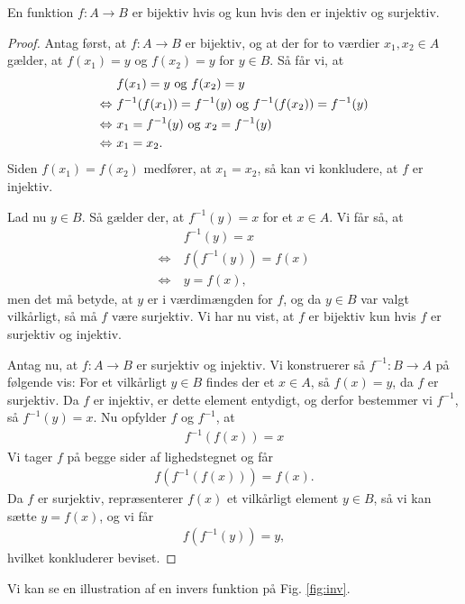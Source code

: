 \begin{setn}
	En funktion $f: A \to B$ er bijektiv hvis og kun hvis den er injektiv og surjektiv. 
\end{setn}
\begin{proof}
	Antag først, at $f: A \to B$ er bijektiv, og at der for to værdier $x_1,x_2\in A$ gælder,
	at $f(x_1) = y$ og $f(x_2)=y$ for $y \in B$. Så får vi, at 
	\begin{align*}
		&f(x_1) = y \textnormal{ og } f(x_2) = y \\
		\Leftrightarrow\  &f^{-1}(f(x_1)) = f^{-1}(y) \textnormal{ og }
		f^{-1}(f(x_2)) = f^{-1}(y)\\
		\Leftrightarrow \ &x_1 = f^{-1}(y) \textnormal{ og } x_2 = f^{-1}(y)\\
		\Leftrightarrow\  &x_1 = x_2.
	\end{align*}
	Siden $f(x_1) = f(x_2)$ medfører, at $x_1 = x_2$, så kan vi konkludere, at $f$ er injektiv.
	
	Lad nu $y\in B$. Så gælder der, at $f^{-1}(y) = x$ for et $x\in A$. Vi får så, at
	\begin{align*}
		&f^{-1}(y) = x  \\
		\Leftrightarrow \ &f(f^{-1}(y)) = f(x) \\
		\Leftrightarrow \ &y = f(x),
	\end{align*}
	men det må betyde, at $y$ er i værdimængden for $f$, og da $y\in B$ var valgt vilkårligt, 
	så må $f$ være surjektiv. Vi har nu vist, at $f$ er bijektiv kun hvis $f$ er surjektiv og 
	injektiv. 
	
	Antag nu, at $f:A\to B$ er surjektiv og injektiv. Vi konstruerer så $f^{-1}:B\to A$ på
	følgende vis: For et vilkårligt $y \in B$ findes der et $x\in A$, så $f(x)= y$, da $f$ er 
	surjektiv. Da $f$ er injektiv, er dette element entydigt, og derfor bestemmer vi $f^{-1}$, 
	så $f^{-1}(y) = x$. Nu opfylder $f$ og $f^{-1}$, at
	\begin{align*}
		f^{-1}(f(x)) = x
	\end{align*}
	Vi tager $f$ på begge sider af lighedstegnet og får
	\begin{align*}
		f(f^{-1}(f(x))) = f(x).
	\end{align*}
	Da $f$ er surjektiv, repræsenterer $f(x)$ et vilkårligt element $y\in B$, så vi kan sætte 
	$y = f(x)$, og vi får
	\begin{align*}
		f(f^{-1}(y)) = y,
	\end{align*}
	hvilket konkluderer beviset. 
\end{proof}
Vi kan se en illustration af en invers funktion på Fig. \ref{fig:inv}. 
